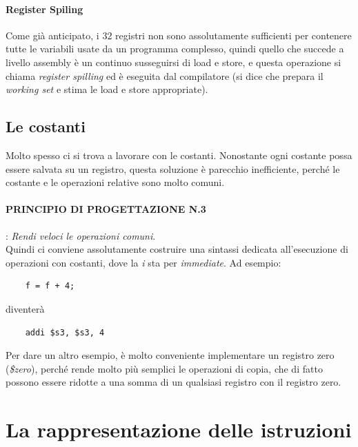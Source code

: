 \documentclass[class=book, crop=false]{standalone}
\begin{document}
\paragraph{Register Spiling}
Come già anticipato, i 32 registri non sono assolutamente sufficienti per contenere tutte le variabili usate da un programma complesso, quindi quello che succede a livello assembly è un continuo susseguirsi di load e store, e questa operazione si chiama \emph{register spilling} ed è eseguita dal compilatore (si dice che  prepara il \textit{working set} e stima le load e store appropriate).

\subsection{Le costanti}
Molto spesso ci si trova a lavorare con le costanti. Nonostante ogni costante possa essere salvata su un registro, questa soluzione è parecchio inefficiente, perché le costante e le operazioni relative sono molto comuni.

\paragraph{PRINCIPIO DI PROGETTAZIONE N.3}: \emph{Rendi veloci le operazioni comuni}.\\

Quindi ci conviene assolutamente costruire una sintassi dedicata all'esecuzione di operazioni con costanti, dove la \emph{i} sta per \emph{immediate}. Ad esempio:
\begin{verbatim}
	f = f + 4;
\end{verbatim}
diventerà
\begin{verbatim}
	addi $s3, $s3, 4
\end{verbatim}

Per dare un altro esempio, è molto conveniente implementare un registro zero (\emph{\$zero}), perché rende molto più semplici le operazioni di copia, che di fatto possono essere ridotte a una somma di un qualsiasi registro con il registro zero.
\section{La rappresentazione delle istruzioni}
\end{document}
